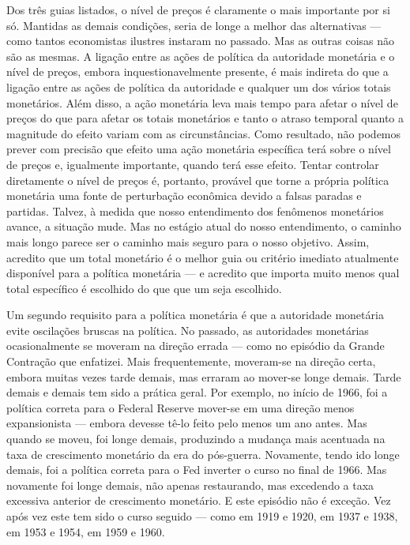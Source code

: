 \documentclass[12pt]{article}
\begin{document}
Dos três guias listados, o nível de preços é claramente o mais importante por si só. Mantidas as demais condições, seria de longe a melhor das alternativas — como tantos economistas ilustres instaram no passado. Mas as outras coisas não são as mesmas. A ligação entre as ações de política da autoridade monetária e o nível de preços, embora inquestionavelmente presente, é mais indireta do que a ligação entre as ações de política da autoridade e qualquer um dos vários totais monetários. Além disso, a ação monetária leva mais tempo para afetar o nível de preços do que para afetar os totais monetários e tanto o atraso temporal quanto a magnitude do efeito variam com as circunstâncias. Como resultado, não podemos prever com precisão que efeito uma ação monetária específica terá sobre o nível de preços e, igualmente importante, quando terá esse efeito. Tentar controlar diretamente o nível de preços é, portanto, provável que torne a própria política monetária uma fonte de perturbação econômica devido a falsas paradas e partidas. Talvez, à medida que nosso entendimento dos fenômenos monetários avance, a situação mude. Mas no estágio atual do nosso entendimento, o caminho mais longo parece ser o caminho mais seguro para o nosso objetivo. Assim, acredito que um total monetário é o melhor guia ou critério imediato atualmente disponível para a política monetária — e acredito que importa muito menos qual total específico é escolhido do que que um seja escolhido.

Um segundo requisito para a política monetária é que a autoridade monetária evite oscilações bruscas na política. No passado, as autoridades monetárias ocasionalmente se moveram na direção errada — como no episódio da Grande Contração que enfatizei. Mais frequentemente, moveram-se na direção certa, embora muitas vezes tarde demais, mas erraram ao mover-se longe demais. Tarde demais e demais tem sido a prática geral. Por exemplo, no início de 1966, foi a política correta para o Federal Reserve mover-se em uma direção menos expansionista — embora devesse tê-lo feito pelo menos um ano antes. Mas quando se moveu, foi longe demais, produzindo a mudança mais acentuada na taxa de crescimento monetário da era do pós-guerra. Novamente, tendo ido longe demais, foi a política correta para o Fed inverter o curso no final de 1966. Mas novamente foi longe demais, não apenas restaurando, mas excedendo a taxa excessiva anterior de crescimento monetário. E este episódio não é exceção. Vez após vez este tem sido o curso seguido — como em 1919 e 1920, em 1937 e 1938, em 1953 e 1954, em 1959 e 1960.
\end{document}
